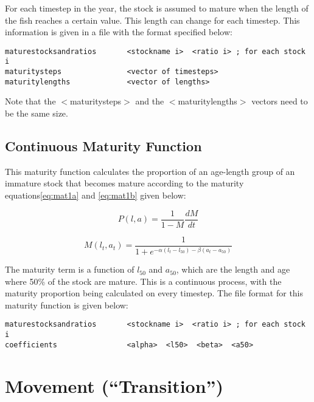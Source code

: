 \documentclass[]{book}
\begin{document}
For each timestep in the year, the stock is assumed to mature when the
length of the fish reaches a certain value. This length can change for
each timestep. This information is given in a file with the format
specified below:

\begin{verbatim}
maturestocksandratios       <stockname i>  <ratio i> ; for each stock i
maturitysteps               <vector of timesteps>
maturitylengths             <vector of lengths>
\end{verbatim}

Note that the \(<\)maturitysteps\(>\) and the \(<\)maturitylengths\(>\) vectors
need to be the same size.

\hypertarget{continuous-maturity-function}{%
\subsection{Continuous Maturity Function}\label{continuous-maturity-function}}

This maturity function calculates the proportion of an age-length group
of an immature stock that becomes mature according to the maturity
equations\eqref{eq:mat1a} and \eqref{eq:mat1b} given below:

\begin{equation}
\label{eq:mat1a}
P(l, a) = {\frac{1}{1 - M}}{\frac{dM}{dt}}\end{equation}

\begin{equation}
\label{eq:mat1b}
M(l_{t},a_{t}) = \frac{1}{1 + e^{-\alpha(l_{t} - l_{50}) - \beta(a_{t} - a_{50})}}\end{equation}

The maturity term is a function of \(l_{50}\) and \(a_{50}\), which are the
length and age where 50\% of the stock are mature. This is a continuous
process, with the maturity proportion being calculated on every
timestep. The file format for this maturity function is given below:

\begin{verbatim}
maturestocksandratios       <stockname i>  <ratio i> ; for each stock i
coefficients                <alpha>  <l50>  <beta>  <a50>
\end{verbatim}

\hypertarget{sec:stockmove}{%
\section{Movement (``Transition'')}\label{sec:stockmove}}
\end{document}
